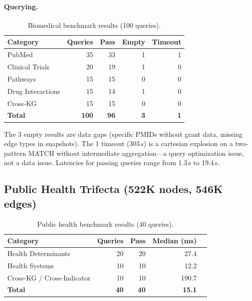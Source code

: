 \documentclass[11pt]{article}
\begin{document}
\paragraph{Querying.}

\begin{table}[H]
  \centering
  \caption{Biomedical benchmark results (100 queries).}
  \label{tab:biomed-results}
  \begin{tabular}{@{}lrrrr@{}}
    \toprule
    \textbf{Category} & \textbf{Queries} & \textbf{Pass} & \textbf{Empty} & \textbf{Timeout} \\
    \midrule
    PubMed            & 35 & 33 & 1 & 1 \\
    Clinical Trials   & 20 & 19 & 1 & 0 \\
    Pathways          & 15 & 15 & 0 & 0 \\
    Drug Interactions & 15 & 14 & 1 & 0 \\
    Cross-KG          & 15 & 15 & 0 & 0 \\
    \midrule
    \textbf{Total}    & \textbf{100} & \textbf{96} & \textbf{3} & \textbf{1} \\
    \bottomrule
  \end{tabular}
\end{table}

The 3 empty results are data gaps (specific PMIDs without grant data, missing edge types in snapshots). The 1 timeout (303\,s) is a cartesian explosion on a two-pattern MATCH without intermediate aggregation---a query optimization issue, not a data issue. Latencies for passing queries range from 1.3\,s to 19.4\,s.

\subsection{Public Health Trifecta (522K nodes, 546K edges)}

\begin{table}[H]
  \centering
  \caption{Public health benchmark results (40 queries).}
  \label{tab:ph-results}
  \begin{tabular}{@{}lrrrr@{}}
    \toprule
    \textbf{Category} & \textbf{Queries} & \textbf{Pass} & \textbf{Median (ms)} \\
    \midrule
    Health Determinants  & 20 & 20 & 27.4 \\
    Health Systems       & 10 & 10 & 12.2 \\
    Cross-KG / Cross-Indicator & 10 & 10 & 190.7 \\
    \midrule
    \textbf{Total}       & \textbf{40} & \textbf{40} & \textbf{15.1} \\
    \bottomrule
  \end{tabular}
\end{table}
\end{document}
